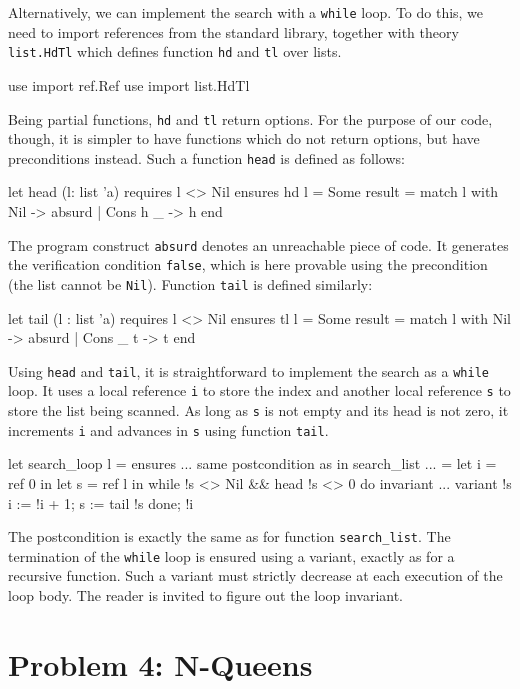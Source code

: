 Alternatively, we can implement the search with a \texttt{while} loop.
To do this, we need to import references from the standard library,
together with theory \texttt{list.HdTl} which defines function
\texttt{hd} and \texttt{tl} over lists.
\begin{whycode}
  use import ref.Ref
  use import list.HdTl
\end{whycode}
Being partial functions, \texttt{hd} and \texttt{tl} return options.
For the purpose of our code, though, it is simpler to have functions
which do not return options, but have preconditions instead. Such a
function \texttt{head} is defined as follows:
\begin{whycode}
  let head (l: list 'a)
    requires { l <> Nil } ensures { hd l = Some result }
  = match l with Nil -> absurd | Cons h _ -> h end
\end{whycode}
The program construct \texttt{absurd} denotes an unreachable piece of
code. It generates the verification condition \texttt{false}, which is
here provable using the precondition (the list cannot be \texttt{Nil}).
Function \texttt{tail} is defined similarly:
\begin{whycode}
  let tail (l : list 'a)
    requires { l <> Nil } ensures { tl l = Some result }
  = match l with Nil -> absurd | Cons _ t -> t end
\end{whycode}
Using \texttt{head} and \texttt{tail}, it is straightforward to
implement the search as a \texttt{while} loop.
It uses a local reference \texttt{i} to store the index and another
local reference \texttt{s} to store the list being scanned.
As long as \texttt{s} is not empty and its head is not zero, it
increments \texttt{i} and advances in \texttt{s} using function \texttt{tail}.
\begin{whycode}
  let search_loop l =
    ensures { ... same postcondition as in search_list ... }
  = let i = ref 0 in
    let s = ref l in
    while !s <> Nil && head !s <> 0 do
      invariant { ... }
      variant   { !s }
      i := !i + 1;
      s := tail !s
    done;
    !i
\end{whycode}
The postcondition is exactly the same as for function \verb|search_list|.
The termination of the \texttt{while} loop is ensured using a variant,
exactly as for a recursive function. Such a variant must strictly decrease at
each execution of the loop body. The reader is invited to figure out
the loop invariant.

\section{Problem 4: N-Queens}

